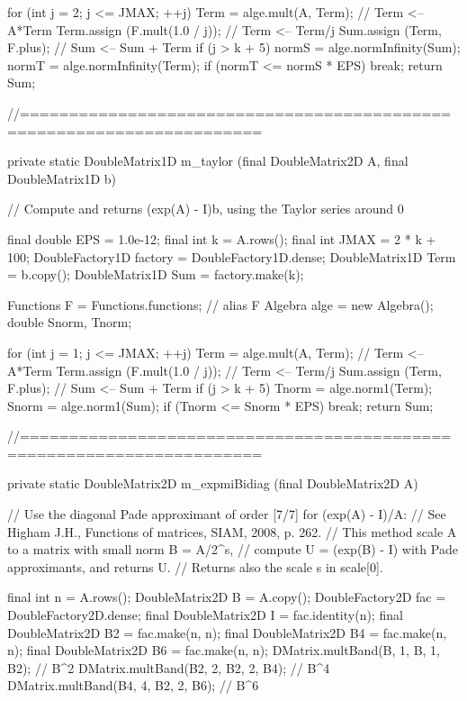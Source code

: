 \begin{code}
\begin{hide}
{{      for (int j = 2; j <= JMAX; ++j) {
         Term = alge.mult(A, Term);            // Term <-- A*Term
         Term.assign (F.mult(1.0 / j));        // Term <-- Term/j
         Sum.assign (Term, F.plus);            // Sum <-- Sum + Term
         if (j > k + 5) {
            normS = alge.normInfinity(Sum);
            normT = alge.normInfinity(Term);
            if (normT <= normS * EPS)
               break;
         }
      }
      return Sum;
   }

   //======================================================================

   private static DoubleMatrix1D m_taylor (final DoubleMatrix2D A, final DoubleMatrix1D b)
   {
      // Compute and returns (exp(A) - I)b, using the Taylor series around 0

      final double EPS = 1.0e-12;
      final int k = A.rows();
      final int JMAX = 2 * k + 100;
      DoubleFactory1D factory = DoubleFactory1D.dense;
      DoubleMatrix1D Term = b.copy();
      DoubleMatrix1D Sum = factory.make(k);

      Functions F = Functions.functions;    // alias F
      Algebra alge = new Algebra();
      double Snorm, Tnorm;

      for (int j = 1; j <= JMAX; ++j) {
         Term = alge.mult(A, Term);            // Term <-- A*Term
         Term.assign (F.mult(1.0 / j));        // Term <-- Term/j
         Sum.assign (Term, F.plus);            // Sum  <-- Sum + Term
         if (j > k + 5) {
            Tnorm = alge.norm1(Term);
            Snorm = alge.norm1(Sum);
            if (Tnorm <= Snorm * EPS)
               break;
         }
      }
      return Sum;
   }


   //======================================================================

   private static DoubleMatrix2D m_expmiBidiag (final DoubleMatrix2D A)
   {
      // Use the diagonal Pade approximant of order [7/7] for (exp(A) - I)/A:
      // See Higham J.H., Functions of matrices, SIAM, 2008, p. 262.
      // This method scale A to a matrix with small norm B = A/2^s,
      // compute U = (exp(B) - I) with Pade approximants, and returns U.
      // Returns also the scale s in scale[0].

      final int n = A.rows();
      DoubleMatrix2D B = A.copy();
      DoubleFactory2D fac = DoubleFactory2D.dense;
      final DoubleMatrix2D I = fac.identity(n);
      final DoubleMatrix2D B2 = fac.make(n, n);
      final DoubleMatrix2D B4 = fac.make(n, n);
      final DoubleMatrix2D B6 = fac.make(n, n);
      DMatrix.multBand(B, 1, B, 1, B2); // B^2
      DMatrix.multBand(B2, 2, B2, 2, B4); // B^4
      DMatrix.multBand(B4, 4, B2, 2, B6); // B^6

}}
\end{hide}
\end{code}
